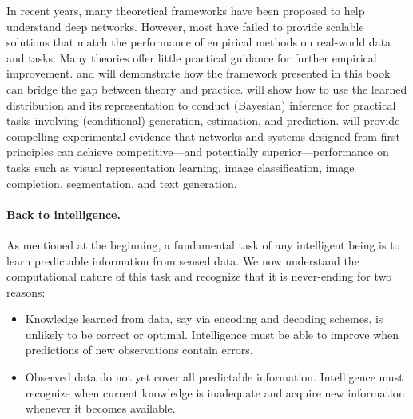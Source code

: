 \documentclass[../../book-main.tex]{subfiles}
\begin{document}
In recent years, many theoretical frameworks have been proposed to help understand deep networks. However, most have failed to provide scalable solutions that match the performance of empirical methods on real-world data and tasks. Many theories offer little practical guidance for further empirical improvement.  and  will demonstrate how the framework presented in this book can bridge the gap between theory and practice.  will show how to use the learned distribution and its representation to conduct (Bayesian) inference for practical tasks involving (conditional) generation, estimation, and prediction.  will provide compelling experimental evidence that networks and systems designed from first principles can achieve competitive---and potentially superior---performance on tasks such as visual representation learning, image classification, image completion, segmentation, and text generation.

\paragraph{Back to intelligence.}
As mentioned at the beginning, a fundamental task of any intelligent being is to learn predictable information from sensed data. We now understand the computational nature of this task and recognize that it is never-ending for two reasons:
\begin{itemize}
    \item Knowledge learned from data, say via encoding and decoding schemes, is unlikely to be correct or optimal. Intelligence must be able to improve when predictions of new observations contain errors.
    \item Observed data do not yet cover all predictable information. Intelligence must recognize when current knowledge is inadequate and acquire new information whenever it becomes available.
\end{itemize}
\end{document}
